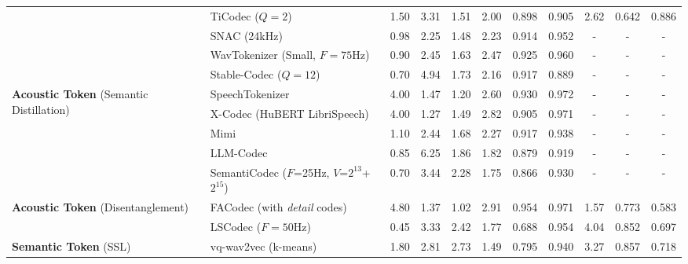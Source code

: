 \begin{table*}[]
{\begin{tabular}{@{}llccccccccc@{}}
 & TiCodec ($Q=2$) & 1.50 & 3.31 & 1.51 & 2.00 & 0.898 & 0.905 & 2.62 & 0.642 & 0.886 
 \\
 & SNAC (24kHz) & 0.98 & 2.25 & 1.48 & 2.23 & 0.914 & 0.952 & - & - & -\\
 & WavTokenizer (Small, $F=75$Hz) & 0.90 & 2.45 & 1.63 & 2.47 & 0.925 & 0.960 &  - & - & -\\
 & Stable-Codec ($Q=12$) & 0.70 & 4.94 & 1.73 & 2.16 & 0.917 & 0.889 & - & - & - \\
 \cmidrule(r){1-2}
\multirow{5}{*}{\textbf{Acoustic Token} (Semantic Distillation)} & SpeechTokenizer & 4.00 & 1.47 & 1.20 & 2.60 & 0.930 & 0.972 & - & - & - \\
& X-Codec (HuBERT LibriSpeech) & 4.00 & 1.27 & 1.49 & 2.82 & 0.905 & 0.971 & - & - & - \\
& Mimi & 1.10 & 2.44 & 1.68 & 2.27 & 0.917 & 0.938 & - & - & - \\
& LLM-Codec & 0.85 & 6.25 & 1.86 & 1.82 & 0.879 & 0.919 & - & - & -\\
& SemantiCodec ($F$=25Hz, $V$=$2^{13}$+$2^{15}$) & 0.70 & 3.44 & 2.28 & 1.75 & 0.866 &  0.930 & - & - & - \\
\cmidrule(r){1-2}
\multirow{2}{*}{\textbf{Acoustic Token} (Disentanglement)} & {FACodec (with \textit{detail} codes)} & 4.80 & 1.37 & 1.02 & 2.91  & 0.954 & 0.971 & 1.57 & 0.773 & 0.583
\\ 
 & LSCodec ($F=50$Hz) & 0.45 & 3.33 & 2.42 & 1.77 & 0.688 & 0.954 & 4.04 & 0.852 & 0.697 
 \\ %
\cmidrule(r){1-2}
\multirow{5}{*}{\textbf{Semantic Token} (SSL)} & vq-wav2vec (k-means) & 1.80 & 2.81  & 2.73 & 1.49 & 0.795 & 0.940 & 3.27 & 0.857 & 0.718
\\

\end{tabular}}
\end{table*}
